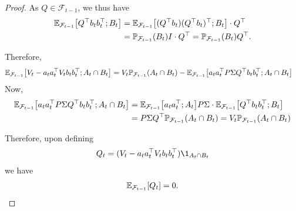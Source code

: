 \begin{proof}
    As $Q \in \mathcal F_{t-1}$, we thus have
    \begin{align*}
        \mathbb{E}_{\mathcal F_{t-1}}\qty[Q^\top b_tb_t^\top ; B_t] &= \mathbb{E}_{\mathcal F_{t-1}}\qty[(Q^\top b_t)(Q^\top b_t)^\top ; B_t] \cdot Q^\top  
        \\&= \mathbb{P}_{\mathcal F_{t-1}}\qty(B_t)I \cdot Q^\top  = \mathbb{P}_{\mathcal F_{t-1}}\qty(B_t)Q^\top .
    \end{align*}

Therefore,
\begin{align*}
    \mathbb{E}_{\mathcal F_{t-1}}\qty[V_t - a_ta_t^\top V_t b_tb_t^\top ; A_t\cap B_t] &= V_t\mathbb{P}_{\mathcal F_{t-1}}\qty(A_t \cap B_t) - \mathbb{E}_{\mathcal F_{t-1}}\qty[a_ta_t^\top P \Sigma Q^\top b_tb_t^\top ; A_t\cap B_t]
\end{align*}
Now,
\begin{align*}
\mathbb{E}_{\mathcal F_{t-1}}\qty[a_ta_t^\top P \Sigma Q^\top b_tb_t^\top ; A_t\cap B_t] &= \mathbb{E}_{\mathcal F_{t-1}}\qty[a_ta_t^\top ; A_t] P \Sigma \cdot \mathbb{E}_{\mathcal F_{t-1}}\qty[Q^\top b_tb_t^\top ; B_t] \\
&= P\Sigma Q^\top\mathbb{P}_{\mathcal F_{t-1}}\qty(A_t \cap B_t) = V_t\mathbb{P}_{\mathcal F_{t-1}}\qty(A_t \cap B_t)
\end{align*}

Therefore, upon defining
\begin{align*}
    Q_t = (V_t - a_ta_t^\top V_t b_tb_t^\top) \1_{A_t \cap B_t}
\end{align*}
we have
\begin{align*}
    \mathbb{E}_{\mathcal F_{t-1}}\qty[Q_t] = 0.
\end{align*}


\end{proof}
